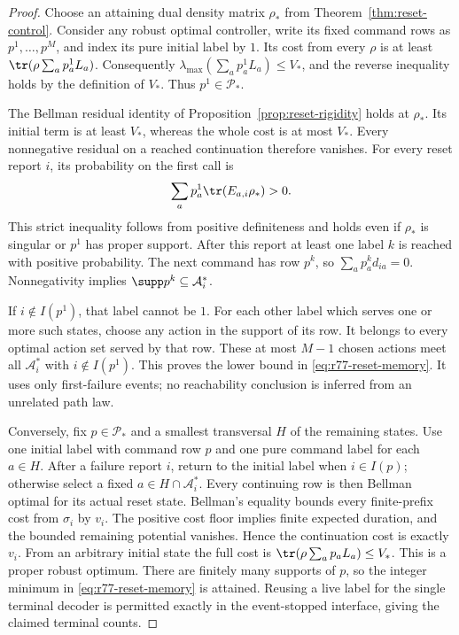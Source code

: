 \begin{proof}
Choose an attaining dual density matrix $\rho_*$ from
Theorem~\ref{thm:reset-control}.  Consider any robust optimal controller,
write its fixed command rows as $p^1,\ldots,p^M$, and index its pure
initial label by $1$.  Its cost from every $\rho$ is at least
$\tr(\rho\sum_a p^1_aL_a)$.  Consequently
$\lambda_{\max}(\sum_a p^1_aL_a)\le V_*$, and the reverse inequality
holds by the definition of $V_*$.  Thus $p^1\in\mathcal P_*$.

The Bellman residual identity of Proposition~\ref{prop:reset-rigidity}
holds at $\rho_*$.  Its initial term is at least $V_*$, whereas the
whole cost is at most $V_*$.  Every nonnegative residual on a reached
continuation therefore vanishes.  For every reset report $i$, its
probability on the first call is
\[
 \sum_a p^1_a\tr(E_{a,i}\rho_*)>0.
\]
This strict inequality follows from positive definiteness and holds
even if $\rho_*$ is singular or $p^1$ has proper support.  After this
report at least one label $k$ is reached with positive probability.
The next command has row $p^k$, so
$\sum_a p^k_a d_{ia}=0$.  Nonnegativity implies
$\supp p^k\subseteq\mathcal A_i^*$.

If $i\notin I(p^1)$, that label cannot be $1$.  For each other label
which serves one or more such states, choose any action in the support
of its row.  It belongs to every optimal action set served by that row.
These at most $M-1$ chosen actions meet all
$\mathcal A_i^*$ with $i\notin I(p^1)$.  This proves the lower bound
in \eqref{eq:r77-reset-memory}.  It uses only first-failure events;
no reachability conclusion is inferred from an unrelated path law.

Conversely, fix $p\in\mathcal P_*$ and a smallest transversal $H$ of
the remaining states.  Use one initial label with command row $p$ and
one pure command label for each $a\in H$.  After a failure report $i$,
return to the initial label when $i\in I(p)$; otherwise select a fixed
$a\in H\cap\mathcal A_i^*$.  Every continuing row is then Bellman
optimal for its actual reset state.  Bellman's equality bounds every
finite-prefix cost from $\sigma_i$ by $v_i$.  The positive cost floor
implies finite expected duration, and the bounded remaining potential
vanishes.  Hence the continuation cost is exactly $v_i$.  From an
arbitrary initial state the full cost is
$\tr(\rho\sum_a p_aL_a)\le V_*$.  This is a proper robust optimum.
There are finitely many supports of $p$, so the integer minimum in
\eqref{eq:r77-reset-memory} is attained.  Reusing a live label for the
single terminal decoder is permitted exactly in the event-stopped
interface, giving the claimed terminal counts.


\end{proof}
